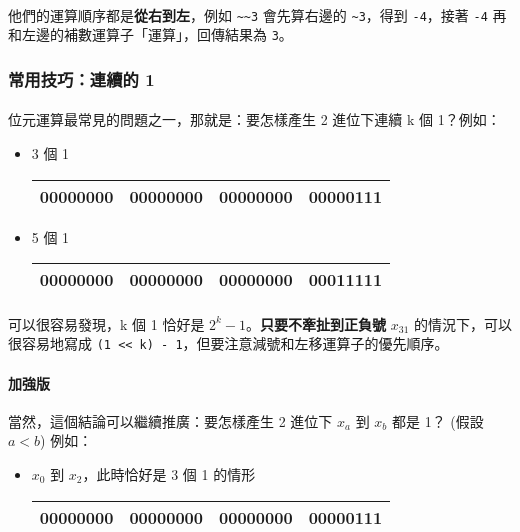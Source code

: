 \documentclass[12pt,a4paper,oneside]{article}
\begin{document}
\begin{CJK}{UTF8}{bkai}
\paragraph{}他們的運算順序都是\textbf{從右到左}，例如 \lstinline!~~3! 會先算右邊的 \lstinline!~3!，得到 \lstinline!-4!，接著 \lstinline!-4! 再和左邊的補數運算子「運算」，回傳結果為 \lstinline!3!。

\subsubsection{常用技巧：連續的 1}

\paragraph{}位元運算最常見的問題之一，那就是：要怎樣產生 2 進位下連續 k 個 1？例如：
\begin{itemize}
\item 3 個 1
\begin{table}[h!]
\centering
\begin{tabular}{|c|c|c|c|}
\hline
00000000 & 00000000 & 00000000 & 00000\textbf{111}\\
\hline
\end{tabular}
\end{table}

\item 5 個 1
\begin{table}[h!]
\centering
\begin{tabular}{|c|c|c|c|}
\hline
00000000 & 00000000 & 00000000 & 000\textbf{11111}\\
\hline
\end{tabular}
\end{table}
\end{itemize}

\paragraph{}可以很容易發現，k 個 1 恰好是 $2^k-1$。\textbf{只要不牽扯到正負號} $x_{31}$ 的情況下，可以很容易地寫成 \lstinline!(1 << k) - 1!，但要注意減號和左移運算子的優先順序。
\paragraph{加強版}當然，這個結論可以繼續推廣：要怎樣產生 2 進位下 $x_a$ 到 $x_b$ 都是 1？ (假設 $a<b$) 例如：

\begin{itemize}
\item $x_0$ 到 $x_2$，此時恰好是 3 個 1 的情形
\begin{table}[h!]
\centering
\begin{tabular}{|c|c|c|c|}
\hline
00000000 & 00000000 & 00000000 & 00000\textbf{111}\\
\hline
\end{tabular}
\end{table}


\end{itemize}
\end{CJK}
\end{document}
